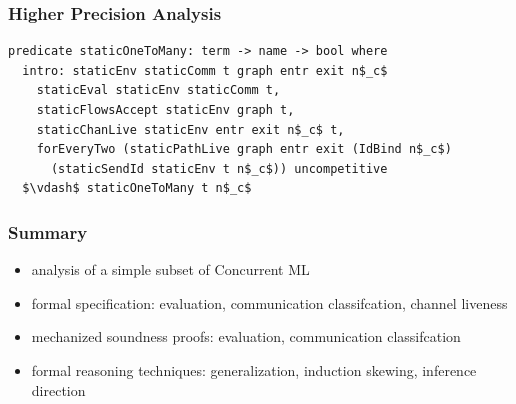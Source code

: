 \documentclass{beamer}
\begin{document}
\begin{frame}[fragile]
\frametitle{Higher Precision Analysis}
\begin{lstlisting}[language=logic, mathescape]
predicate staticOneToMany: term -> name -> bool where
  intro: staticEnv staticComm t graph entr exit n$_c$ 
    staticEval staticEnv staticComm t,
    staticFlowsAccept staticEnv graph t,
    staticChanLive staticEnv entr exit n$_c$ t, 
    forEveryTwo (staticPathLive graph entr exit (IdBind n$_c$)
      (staticSendId staticEnv t n$_c$)) uncompetitive
  $\vdash$ staticOneToMany t n$_c$
\end{lstlisting}
\end{frame}

\begin{frame}[fragile]
\frametitle{Summary}
\begin{itemize}
\item analysis of a simple subset of Concurrent ML
\item formal specification: evaluation, communication classifcation, channel liveness
\item mechanized soundness proofs: evaluation, communication classifcation 
\item formal reasoning techniques: generalization, induction skewing, inference direction 
\end{itemize}
\end{frame}
\end{document}
